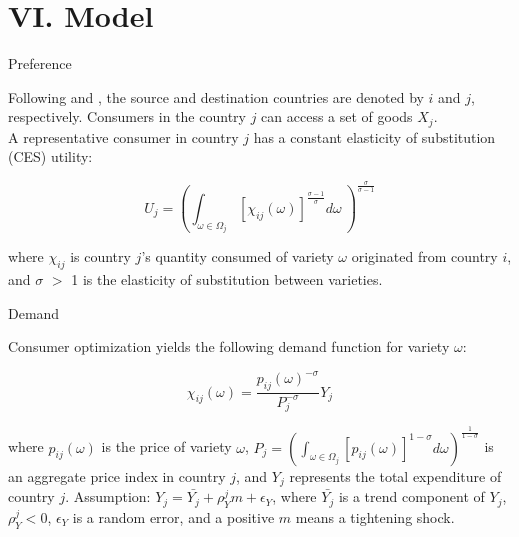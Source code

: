 \documentclass[10pt]{beamer}
\begin{document}

\section{VI. Model}

\begin{frame}{Preference}

Following \cite{melitz2003impact}and \cite{manova2012export}, the source and destination countries are denoted by $i$ and $j$, respectively. Consumers in the country $j$ can access a set of goods $X_j$. \\
\medskip
A representative consumer in country $j$ has a constant elasticity of substitution (CES) utility:

\begin{equation}
U_j=(\int_{\omega \in \Omega_j} [\chi_{ij}(\omega)]^{\frac{\sigma-1}{\sigma}} d\omega\ )^\frac{\sigma}{\sigma-1}
\end{equation}

where $\chi_{ij}$ is country $j$’s quantity consumed of variety $\omega$ originated from country $i$, and $\sigma$ $>$ 1 is the elasticity of substitution between varieties. 

\end{frame}


\begin{frame}{Demand}

Consumer optimization yields the following demand function for variety $\omega$:

\begin{equation}
\chi_{ij}(\omega)=\frac{p_{ij}(\omega)^{-\sigma}}{P_j^{-\sigma}} Y_j
\end{equation}


where $p_{ij}(\omega)$ is the price of variety $\omega$, $P_j=(\int_{\omega \in \Omega_j} [p_{ij}(\omega)]^{1-\sigma} d \omega)^{\frac{1}{1-\sigma}}$ is an aggregate price index in country $j$, and $Y_j$ represents the total expenditure of country $j$.
\vfill
Assumption: $Y_j=\bar{Y_j}+\rho_{Y}^j m+\epsilon_Y$, where $\bar{Y_j}$ is a trend component of $Y_j$, $\rho_{Y}^j<0$, $\epsilon_Y$ is a random error, and a positive $m$ means a tightening shock.

\end{frame}
\end{document}
